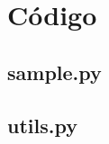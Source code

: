\appendix
\clearpage
\addappheadtotoc
\appendixpage

\section{Código}

\subsection{sample.py}\label{ap:sample.py}


\newpage

\subsection{utils.py}\label{ap:utils.py}
